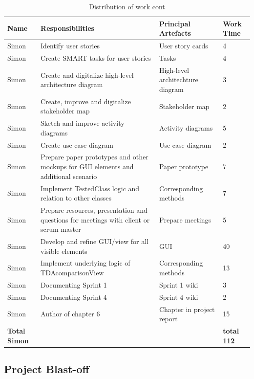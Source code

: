\begin{table}[!h]
  \caption{Distribution of work cont}
  \centering
  \begin{tabular}{p{2cm}||p{4.2cm}|p{4cm}|l|}
    Name & Responsibilities & Principal Artefacts & Work Time\\
    \hline
    \hline
    Simon & Identify user stories & User story cards & 4 \\
    \hline
    Simon & Create SMART tasks for user stories & Tasks & 4 \\
    \hline
    Simon & Create and digitalize high-level architecture diagram & High-level architechture diagram & 3 \\ 
    \hline
    Simon & Create, improve and digitalize stakeholder map & Stakeholder map & 2 \\ 
    \hline
    Simon & Sketch and improve activity diagrams & Activity diagrams & 5 \\ 
    \hline
    Simon & Create use case diagram & Use case diagram & 2 \\ 
    \hline
    Simon & Prepare paper prototypes and other mockups for GUI elements and additional scenario & Paper prototype & 7 \\
    \hline
    Simon & Implement TestedClass logic and relation to other classes & Corresponding methods & 7 \\ 
    \hline
    Simon & Prepare resources, presentation and questions for meetings with client or scrum master & Prepare meetings & 5 \\ 
    \hline
    Simon & Develop and refine GUI/view for all visible elements & GUI & 40 \\ 
    \hline
    Simon & Implement underlying logic of TDAcomparisonView & Corresponding methods & 13 \\ 
    \hline
    Simon & Documenting Sprint 1 & Sprint 1 wiki & 3 \\ 
    \hline 
    Simon & Documenting Sprint 4 & Sprint 4 wiki & 2 \\ 
    \hline 
    Simon & Author of chapter 6 & Chapter in project report & 15 \\ 
    \hline
    \hline 
    \textbf{Total \newline Simon} & & & \textbf{total 112}   \\
    \hline
    \hline
  \end{tabular}
\end{table}    

\subsection{Project Blast-off}

